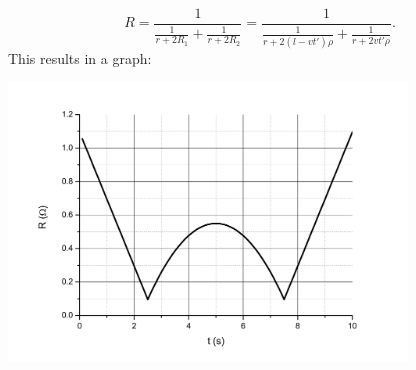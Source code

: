 \[
R=\frac{1}{\frac{1}{r+2R_1}+\frac{1}{r+2R_2}}=\frac{1}{\frac{1}{r+2(l-vt')\rho}+\frac{1}{r+2vt'\rho}}.
\] 
This results in a graph:
\begin{center}
\includegraphics[width=300pt]{2012-v2g-08-rong_graafik}
\end{center}
\probend
